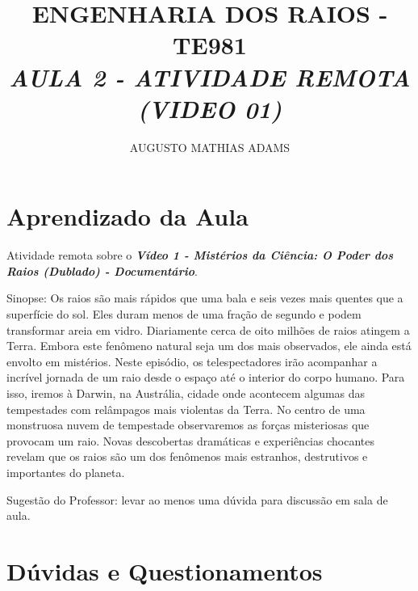 \documentclass[a4paper, 12pt, onecolumn,singlespacing]{article}
\title{\normalsize{ENGENHARIA DOS RAIOS - TE981}\\ \huge{\textbf\textit{{AULA 2 - ATIVIDADE REMOTA (VIDEO 01)}}\\}}
\author{\small{AUGUSTO MATHIAS ADAMS}}
\begin{document}
	
	\maketitle
	
	\section{Aprendizado da Aula}
	
	Atividade remota sobre o \textbf{\textit{Vídeo 1 - Mistérios da Ciência: O Poder dos Raios (Dublado) - Documentário}}.
	
	Sinopse: Os raios são mais rápidos que uma bala e seis vezes mais quentes que a superfície do sol. Eles duram menos de uma fração de segundo e podem transformar areia em vidro. Diariamente cerca de oito milhões de raios atingem a Terra. Embora este fenômeno natural seja um dos mais observados, ele ainda está envolto em mistérios. Neste episódio, os telespectadores irão acompanhar a incrível jornada de um raio desde o espaço até o interior do corpo humano. Para isso, iremos à Darwin, na Austrália, cidade onde acontecem algumas das tempestades com relâmpagos mais violentas da Terra. No centro de uma monstruosa nuvem de tempestade observaremos as forças misteriosas que provocam um raio. Novas descobertas dramáticas e experiências chocantes revelam que os raios são um dos fenômenos mais estranhos, destrutivos e importantes do planeta.
	
	Sugestão do Professor: levar ao menos uma dúvida para discussão em sala de aula.
	
	\section{Dúvidas e Questionamentos}
	
\end{document}
